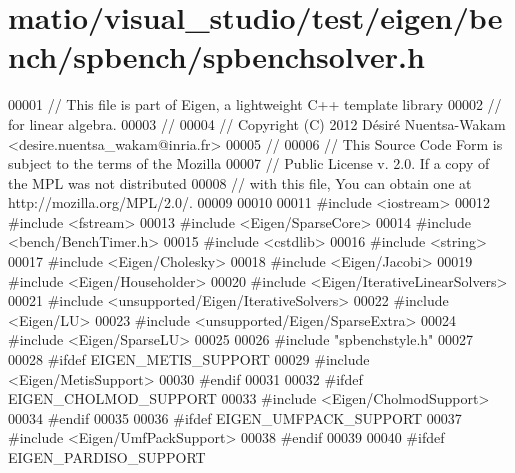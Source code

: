 \hypertarget{matio_2visual__studio_2test_2eigen_2bench_2spbench_2spbenchsolver_8h_source}{}\section{matio/visual\+\_\+studio/test/eigen/bench/spbench/spbenchsolver.h}
\label{matio_2visual__studio_2test_2eigen_2bench_2spbench_2spbenchsolver_8h_source}

\begin{DoxyCode}
00001 \textcolor{comment}{// This file is part of Eigen, a lightweight C++ template library}
00002 \textcolor{comment}{// for linear algebra.}
00003 \textcolor{comment}{//}
00004 \textcolor{comment}{// Copyright (C) 2012 Désiré Nuentsa-Wakam <desire.nuentsa\_wakam@inria.fr>}
00005 \textcolor{comment}{//}
00006 \textcolor{comment}{// This Source Code Form is subject to the terms of the Mozilla}
00007 \textcolor{comment}{// Public License v. 2.0. If a copy of the MPL was not distributed}
00008 \textcolor{comment}{// with this file, You can obtain one at http://mozilla.org/MPL/2.0/.}
00009 
00010 
00011 \textcolor{preprocessor}{#include <iostream>}
00012 \textcolor{preprocessor}{#include <fstream>}
00013 \textcolor{preprocessor}{#include <Eigen/SparseCore>}
00014 \textcolor{preprocessor}{#include <bench/BenchTimer.h>}
00015 \textcolor{preprocessor}{#include <cstdlib>}
00016 \textcolor{preprocessor}{#include <string>}
00017 \textcolor{preprocessor}{#include <Eigen/Cholesky>}
00018 \textcolor{preprocessor}{#include <Eigen/Jacobi>}
00019 \textcolor{preprocessor}{#include <Eigen/Householder>}
00020 \textcolor{preprocessor}{#include <Eigen/IterativeLinearSolvers>}
00021 \textcolor{preprocessor}{#include <unsupported/Eigen/IterativeSolvers>}
00022 \textcolor{preprocessor}{#include <Eigen/LU>}
00023 \textcolor{preprocessor}{#include <unsupported/Eigen/SparseExtra>}
00024 \textcolor{preprocessor}{#include <Eigen/SparseLU>}
00025 
00026 \textcolor{preprocessor}{#include "spbenchstyle.h"}
00027 
00028 \textcolor{preprocessor}{#ifdef EIGEN\_METIS\_SUPPORT}
00029 \textcolor{preprocessor}{#include <Eigen/MetisSupport>}
00030 \textcolor{preprocessor}{#endif}
00031 
00032 \textcolor{preprocessor}{#ifdef EIGEN\_CHOLMOD\_SUPPORT}
00033 \textcolor{preprocessor}{#include <Eigen/CholmodSupport>}
00034 \textcolor{preprocessor}{#endif}
00035 
00036 \textcolor{preprocessor}{#ifdef EIGEN\_UMFPACK\_SUPPORT}
00037 \textcolor{preprocessor}{#include <Eigen/UmfPackSupport>}
00038 \textcolor{preprocessor}{#endif}
00039 
00040 \textcolor{preprocessor}{#ifdef EIGEN\_PARDISO\_SUPPORT}

\end{DoxyCode}
